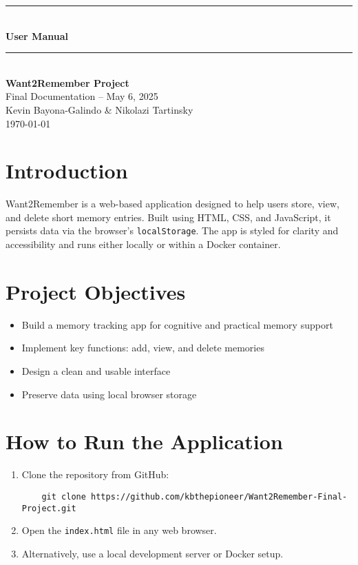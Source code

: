 \documentclass[12pt]{article}
\begin{document}
\begin{titlepage}
    \newcommand{\HRule}{\rule{\linewidth}{0.5mm}} 
    \vspace*{\fill}
    \begin{center}
        \HRule \\[0.5cm]
        {\Huge \bfseries User Manual \\[0.4cm]}
        \HRule \\[1.5cm]
        {\LARGE \textbf{Want2Remember Project}}\\[0.5cm]
        {\Large Final Documentation – May 6, 2025}\\[2cm]
        {\Large Kevin Bayona-Galindo \& Nikolazi Tartinsky}\\[0.5cm]
        {\large \today}
    \end{center}
    \vspace*{\fill}
\end{titlepage}

\tableofcontents
\newpage

\section{Introduction}
Want2Remember is a web-based application designed to help users store, view, and delete short memory entries. Built using HTML, CSS, and JavaScript, it persists data via the browser’s \texttt{localStorage}. The app is styled for clarity and accessibility and runs either locally or within a Docker container.

\section{Project Objectives}
\begin{itemize}
  \item Build a memory tracking app for cognitive and practical memory support
  \item Implement key functions: add, view, and delete memories
  \item Design a clean and usable interface
  \item Preserve data using local browser storage
\end{itemize}

\section{How to Run the Application}
\begin{enumerate}
  \item Clone the repository from GitHub:
    \begin{verbatim}
    git clone https://github.com/kbthepioneer/Want2Remember-Final-Project.git
    \end{verbatim}
  \item Open the \texttt{index.html} file in any web browser.
  \item Alternatively, use a local development server or Docker setup.
\end{enumerate}
\end{document}
